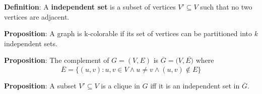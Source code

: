 \begin{framed}
   \textbf{Definition}: A \textbf{independent set} is a subset of vertices $V' \subseteq V$ such that no two vertices are adjacent. 
\end{framed}

\begin{framed}
   \textbf{Proposition}: A graph is k-colorable if its set of vertices can be partitioned into $k$ independent sets. 
\end{framed}

\begin{framed}
   \textbf{Proposition}: The complement of $G = (V, E)$ is $\overline{G}= (V, \overline{E)}$ where
   \[
     \overline{E} = \{ (u, v) : u, v \in V \land u\neq v \land (u, v) \notin E \} 
   \] 
\end{framed}

\begin{framed}
   \textbf{Proposition}: A subset $V' \subseteq V$ is a clique in $G$ iff it is an independent set in $\overline{G}$. 
\end{framed}











